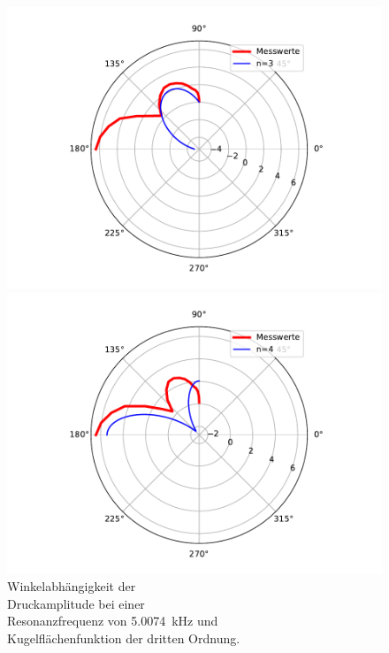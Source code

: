\begin{figure}
    \hspace*{2cm}
    \begin{minipage}[b]{.4\linewidth} %
        \hspace*{-2cm}
        \includegraphics[width=\linewidth]{figure/Resonanz_Drewinkel_Amplitude_4_n3.pdf}
        \caption{Winkelabhängigkeit der\\ Druckamplitude bei einer \\ Resonanzfrequenz von \SI{5.0074}{\kilo\hertz} und \\ Kugelflächenfunktion der dritten Ordnung.}
     \end{minipage}
     \hspace{.1\linewidth}%
     \begin{minipage}[b]{.4\linewidth} %
        \hspace*{-2cm}
        \includegraphics[width=\linewidth]{figure/Resonanz_Drewinkel_Amplitude_4_n4.pdf}

\end{minipage}
\end{figure}
